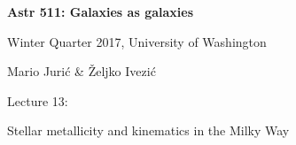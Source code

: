 \documentclass[letterpaper,landscape]{slides}
\begin{document}

\begin{slide}

\phantom{x}
\vskip -2in
\begin{center}
\bfseries
{\large {\color{blue} Astr 511: Galaxies as galaxies}}
\end{center}

{\centerline {{\color{blue} 
Winter Quarter 2017, University of Washington}}}
{\centerline {{\color{blue} 
Mario Juri\'{c} \& \v{Z}eljko Ivezi\'{c} }}}

\vskip 1.6in

{\centerline {\huge {\color{red}      Lecture 13:             }}}
\vskip 0.2in 
{\centerline {\Large {\color{blue}  Stellar metallicity and kinematics in the Milky Way }}}

\vfill
\end{slide}
\end{document}
